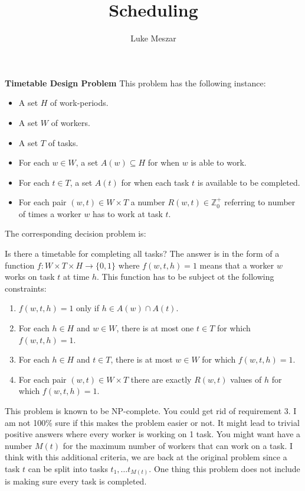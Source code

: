 \documentclass[12pt]{article}
\title{Scheduling}
\author{Luke Meszar}
\date{\empty}
\theoremstyle{definition}
\numberwithin{equation}{section}
\newcommand{\Z}{\mathbb{Z}}
\newcommand{\func}[3]{#1\colon #2 \rightarrow #3}
\newcommand{\ssteq}{\subseteq}
\begin{document}
\textbf{Timetable Design Problem}
This problem has the following instance:
\begin{itemize}
	\item A set $H$ of work-periods.
	\item A set $W$ of workers.
	\item A set $T$ of tasks. 
	\item For each $w \in W$, a set $A(w) \ssteq H$ for when $w$ is able to work. 
	\item For each $t \in T$, a set $A(t)$ for when each task $t$ is available to be completed. 
	\item For each pair $(w,t) \in W\times T$ a number $R(w,t) \in \Z_0^+$ referring to number of times a worker $w$ has to work at task $t$. 
\end{itemize}

The corresponding decision problem is:

Is there a timetable for completing all tasks? The answer is in the form of a function $\func{f}{W\times T\times H}{\{0,1\}}$ where $f(w,t,h) = 1$ means that a worker $w$ works on task $t$ at time $h$. This function has to be subject ot the following constraints:

\begin{enumerate}
	\item $f(w,t,h) = 1$ only if $h \in A(w) \cap A(t)$. 
	\item  For each $h \in H$ and $w \in W$, there is at most one $t \in T$ for which $f(w,t,h) = 1$. 
	\item For each $h \in H$ and $t \in T$, there is at most $w \in W$ for which $f(w,t,h) = 1$.
	\item  For each pair $(w,t) \in W \times T$ there are exactly $R(w,t)$ values of $h$ for which $f(w,t,h) = 1$. 
\end{enumerate}


This problem is known to be NP-complete. You could get rid of requirement 3. I am not 100\% sure if this makes the problem easier or not. It might lead to trivial positive answers where every worker is working on 1 task. You might want have a number $M(t)$ for the maximum number of workers that can work on a task. I think with this additional criteria, we are back at the original problem since a task $t$ can be split into tasks $t_1, \ldots t_{M(t)}$. One thing this problem does not include is making sure every task is completed. 
\end{document}
